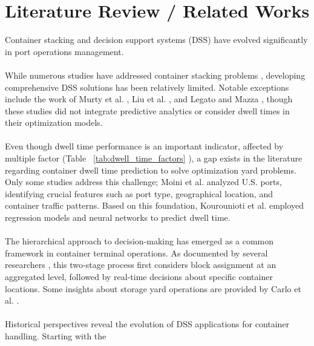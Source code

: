 \chapter{Literature Review / Related Works}%
	Container stacking and decision support systems (DSS) have evolved significantly in port operations management.
	\\
	\\
	While numerous studies have addressed container stacking problems
	\cite{gharehgozli2014decision, ries2014fuzzy, bazzazi2009genetic, guven2019modelling, guerra2018heuristic,
		nishimura2009container, sharma2014genetic, park2011dynamic, goerigk2016robust}, developing comprehensive DSS
	solutions has been relatively limited. Notable exceptions include the work of Murty et al.
	\cite{murty2005decision}, Liu et al. \cite{liu2010decision}, and Legato and Mazza \cite{legato2018decision},
	though these studies did not integrate predictive analytics or consider dwell times in their optimization models.
	\\
	\\
	Even though dwell time performance is an important indicator, affected by multiple factor (Table~
	\ref{tab:dwell_time_factors}
	), a gap exists in the literature regarding container dwell time prediction to solve optimization yard
	problems. Only some studies address this challenge; Moini et al. \cite{moini2012estimating}
	analyzed U.S. ports, identifying crucial features such as port type, geographical location, and container traffic
	patterns. Based on this foundation, Kourounioti et al. \cite{kourounioti2016development}
	employed regression models and neural networks to predict dwell time.
	\\
	\\
	The hierarchical approach to decision-making has emerged as a common framework in container terminal
	operations.
	As documented by several researchers \cite{zhang2003storage, chen2012storage, park2011dynamic}, this two-stage
	process first considers block assignment at an aggregated level, followed by real-time decisions about specific
	container locations. Some insights about storage yard operations are provided by Carlo et al.
	\cite{carlo2014storage}.
	\\
	\\
	Historical perspectives reveal the evolution of DSS applications for container handling. Starting with the
